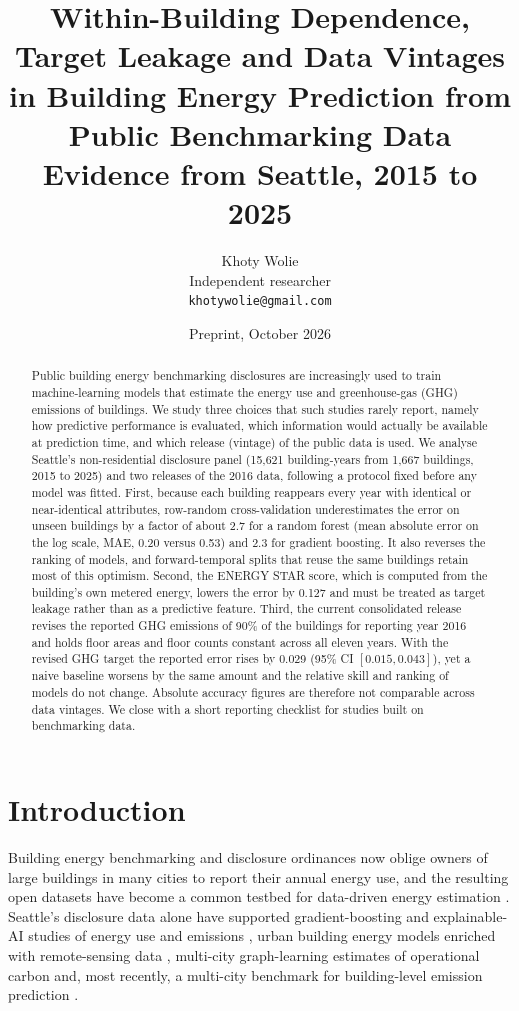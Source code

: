 \documentclass[11pt]{article}
\title{Within-Building Dependence, Target Leakage and Data Vintages in Building Energy Prediction from Public Benchmarking Data\\[6pt]\large Evidence from Seattle, 2015 to 2025}
\author{Khoty Wolie\\Independent researcher\\\texttt{khotywolie@gmail.com}}
\date{Preprint, October 2026}
\begin{document}
\maketitle

\begin{abstract}
Public building energy benchmarking disclosures are increasingly used to train machine-learning models that estimate the energy use and greenhouse-gas (GHG) emissions of buildings. We study three choices that such studies rarely report, namely how predictive performance is evaluated, which information would actually be available at prediction time, and which release (vintage) of the public data is used. We analyse Seattle's non-residential disclosure panel (15{,}621 building-years from 1{,}667 buildings, 2015 to 2025) and two releases of the 2016 data, following a protocol fixed before any model was fitted. First, because each building reappears every year with identical or near-identical attributes, row-random cross-validation underestimates the error on unseen buildings by a factor of about 2.7 for a random forest (mean absolute error on the log scale, MAE, 0.20 versus 0.53) and 2.3 for gradient boosting. It also reverses the ranking of models, and forward-temporal splits that reuse the same buildings retain most of this optimism. Second, the ENERGY STAR score, which is computed from the building's own metered energy, lowers the error by 0.127 and must be treated as target leakage rather than as a predictive feature. Third, the current consolidated release revises the reported GHG emissions of 90\% of the buildings for reporting year 2016 and holds floor areas and floor counts constant across all eleven years. With the revised GHG target the reported error rises by 0.029 (95\% CI $[0.015, 0.043]$), yet a naive baseline worsens by the same amount and the relative skill and ranking of models do not change. Absolute accuracy figures are therefore not comparable across data vintages. We close with a short reporting checklist for studies built on benchmarking data.
\end{abstract}

\section{Introduction}
\label{sec:intro}

Building energy benchmarking and disclosure ordinances now oblige owners of large buildings in many cities to report their annual energy use, and the resulting open datasets have become a common testbed for data-driven energy estimation \cite{kontokosta2017citywide,papadopoulos2019grading,amasyali2018review}. Seattle's disclosure data alone have supported gradient-boosting and explainable-AI studies of energy use and emissions \cite{pan2020data,zhang2023xai,zhang2023gtwr}, urban building energy models enriched with remote-sensing data \cite{worthy2025eo}, multi-city graph-learning estimates of operational carbon \cite{yap2025revealing} and, most recently, a multi-city benchmark for building-level emission prediction \cite{duan2026ghgbench}.
\end{document}
